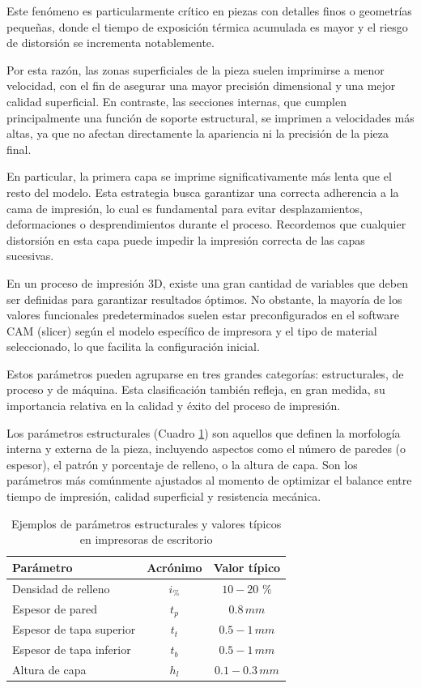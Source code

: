 Este fenómeno es particularmente crítico en piezas con detalles finos o geometrías pequeñas, donde el tiempo de exposición térmica acumulada es mayor y el riesgo de distorsión se incrementa notablemente.

Por esta razón, las zonas superficiales de la pieza suelen imprimirse a menor velocidad, con el fin de asegurar una mayor precisión dimensional y una mejor calidad superficial. En contraste, las secciones internas, que cumplen principalmente una función de soporte estructural, se imprimen a velocidades más altas, ya que no afectan directamente la apariencia ni la precisión de la pieza final.

En particular, la primera capa se imprime significativamente más lenta que el resto del modelo. Esta estrategia busca garantizar una correcta adherencia a la cama de impresión, lo cual es fundamental para evitar desplazamientos, deformaciones o desprendimientos durante el proceso. Recordemos que cualquier distorsión en esta capa puede impedir la impresión correcta de las capas sucesivas.

En un proceso de impresión 3D, existe una gran cantidad de variables que deben ser definidas para garantizar resultados óptimos. No obstante, la mayoría de los valores funcionales predeterminados suelen estar preconfigurados en el software CAM (slicer) según el modelo específico de impresora y el tipo de material seleccionado, lo que facilita la configuración inicial.

Estos parámetros pueden agruparse en tres grandes categorías: estructurales, de proceso y de máquina. Esta clasificación también refleja, en gran medida, su importancia relativa en la calidad y éxito del proceso de impresión. 

Los parámetros estructurales (Cuadro \ref{tab:param-estructurales}) son aquellos que definen la morfología interna y externa de la pieza, incluyendo aspectos como el número de paredes (o espesor), el patrón y porcentaje de relleno, o la altura de capa. Son los parámetros más comúnmente ajustados al momento de optimizar el balance entre tiempo de impresión, calidad superficial y resistencia mecánica.

\begin{table}[ht]
  \centering
  \caption{Ejemplos de parámetros estructurales y valores típicos en impresoras de escritorio}
  \label{tab:param-estructurales}
  \begin{tabular}{@{} l c c @{}}
    \toprule
    Parámetro                   & Acrónimo       & Valor típico     \\
    \midrule
    Densidad de relleno        & $i_{\%}$     &     $\mathrm{10-20}$ $\%$\\
    Espesor de pared            & $t_{p}$        &   $\mathrm{0.8}\,mm$  \\
    Espesor de tapa superior          & $t_{t}$ & $\mathrm{0.5-1}\,mm$\\
    Espesor de tapa inferior            & $t_{b}$ & $\mathrm{0.5-1}\, mm$\\
    Altura de capa           & $h_{l}$            &  $\mathrm{0.1-0.3}\, mm$    \\
    \bottomrule
  \end{tabular}
\end{table}

